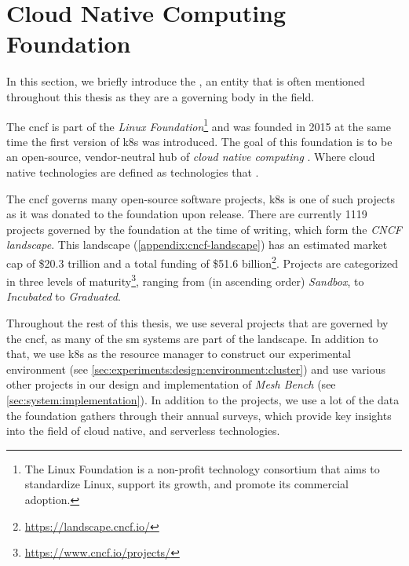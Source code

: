 \section{Cloud Native Computing Foundation}
\label{sec:background:cncf}


In this section, we briefly introduce the , an entity that is often mentioned throughout this thesis as they are a governing body in the field. 

The \gls{cncf} is part of the \textit{Linux Foundation}\footnote{The Linux Foundation  is a non-profit technology consortium that aims to standardize Linux, support its growth, and promote its commercial adoption.} and was founded in 2015 at the same time the first version of \gls{k8s} was introduced. The goal of this foundation is to be an open-source, vendor-neutral hub of \textit{cloud native computing} \cite{cncf-who-are-we}. Where cloud native technologies are defined as technologies that .

The \gls{cncf} governs many open-source software projects, \gls{k8s} is one of such projects as it was donated to the foundation upon release. There are currently 1119 projects governed by the foundation at the time of writing, which form the \textit{CNCF landscape}. This landscape (\cref{appendix:cncf-landscape}) has an estimated market cap of \$20.3 trillion and a total funding of \$51.6 billion\footnote{\url{https://landscape.cncf.io/}}. Projects are categorized in three levels of maturity\footnote{\url{https://www.cncf.io/projects/}}, ranging from (in ascending order) \textit{Sandbox}, to \textit{Incubated} to \textit{Graduated}.

Throughout the rest of this thesis, we use several projects that are governed by the \gls{cncf}, as many of the \gls{sm} systems are part of the landscape. In addition to that, we use \gls{k8s} as the resource manager to construct our experimental environment (see \cref{sec:experiments:design:environment:cluster}) and use various 
 other projects in our design and implementation of \textit{Mesh Bench} (see \cref{sec:system:implementation}). In addition to the projects, we use a lot of the data the foundation gathers through their annual surveys, which provide key insights into the field of cloud native, and serverless technologies.
 